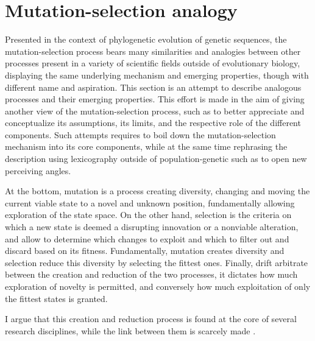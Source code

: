 \section{Mutation-selection analogy}
Presented in the context of phylogenetic evolution of genetic sequences, the mutation-selection process bears many similarities and analogies between other processes present in a variety of scientific fields outside of evolutionary biology, displaying the same underlying mechanism and emerging properties, though with different name and aspiration. 
This section is an attempt to describe analogous processes and their emerging properties.
This effort is made in the aim of giving another view of the mutation-selection process, such as to better appreciate and conceptualize its assumptions, its limits, and the respective role of the different components. 
Such attempts requires to boil down the mutation-selection mechanism into its core components, while at the same time rephrasing the description using lexicography outside of population-genetic such as to open new perceiving angles.

At the bottom, mutation is a process creating diversity, changing and moving the current viable state to a novel and unknown position, fundamentally allowing exploration of the state space.
On the other hand, selection is the criteria on which a new state is deemed a disrupting innovation or a nonviable alteration, and allow to determine which changes to exploit and which to filter out and discard based on its fitness.
Fundamentally, mutation creates diversity and selection reduce this diversity by selecting the fittest ones.
Finally, drift arbitrate between the creation and reduction of the two processes, it dictates how much exploration of novelty is permitted, and conversely how much exploitation of only the fittest states is granted.

I argue that this creation and reduction process is found at the core of several research disciplines, while the link between them is scarcely made \citep{Baeck1994, Eiben1998}. 

